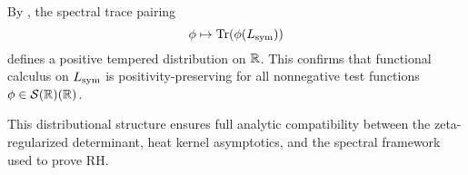 \begin{remark}
\label{rem:trace_positivity_closure}

By , the spectral trace pairing
\[
\phi \mapsto \operatorname{Tr}(\phi(L_{\mathrm{sym}}))
\]
defines a positive tempered distribution on \( \mathbb{R} \). This confirms that functional calculus on \( L_{\mathrm{sym}} \) is positivity-preserving for all nonnegative test functions \( \phi \in \mathcal{S}(\mathbb{R})(\mathbb{R}) \).

This distributional structure ensures full analytic compatibility between the zeta-regularized determinant, heat kernel asymptotics, and the spectral framework used to prove RH.
\end{remark}
